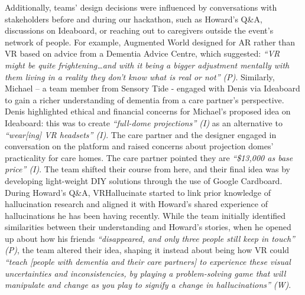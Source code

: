Additionally, teams’ design decisions were influenced by conversations with stakeholders before and during our hackathon, such as Howard’s Q\&A, discussions on Ideaboard, or reaching out to caregivers outside the event’s network of people. For example, Augmented World designed for AR rather than VR based on advice from a Dementia Advice Centre, which suggested: \textit{“VR might be quite frightening…and with it being a bigger adjustment mentally with them living in a reality they don’t know what is real or not” (P)}. Similarly, Michael – a team member from Sensory Tide - engaged with Denis via Ideaboard to gain a richer understanding of dementia from a care partner’s perspective. Denis highlighted ethical and financial concerns for Michael’s proposed idea on Ideaboard: this was to create\textit{ “full-dome projections” (I)} as an alternative to \textit{“wear[ing] VR headsets” (I)}. The care partner and the designer engaged in conversation on the platform and raised concerns about projection domes’ practicality for care homes. The care partner pointed they are \textit{“\$13,000 as base price” (I)}. The team shifted their course from here, and their final idea was by developing light-weight DIY solutions through the use of Google Cardboard. During Howard’s Q\&A, VRHallucinate started to link prior knowledge of hallucination research and aligned it with Howard’s shared experience of hallucinations he has been having recently. While the team initially identified similarities between their understanding and Howard’s stories, when he opened up about how his friends\textit{ “disappeared, and only three people still keep in touch” (P)}, the team altered their idea, shaping it instead about being how VR could \textit{“teach [people with dementia and their care partners] to experience these visual uncertainties and inconsistencies, by playing a problem-solving game that will manipulate and change as you play to signify a change in hallucinations” (W)}. 


